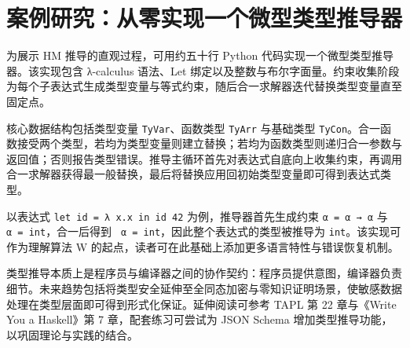 \chapter{案例研究：从零实现一个微型类型推导器}
为展示 HM 推导的直观过程，可用约五十行 Python 代码实现一个微型类型推导器。该实现包含 λ-calculus 语法、Let 绑定以及整数与布尔字面量。约束收集阶段为每个子表达式生成类型变量与等式约束，随后合一求解器迭代替换类型变量直至固定点。\par
核心数据结构包括类型变量 \texttt{TyVar}、函数类型 \texttt{TyArr} 与基础类型 \texttt{TyCon}。合一函数接受两个类型，若均为类型变量则建立替换；若均为函数类型则递归合一参数与返回值；否则报告类型错误。推导主循环首先对表达式自底向上收集约束，再调用合一求解器获得最一般替换，最后将替换应用回初始类型变量即可得到表达式类型。\par
以表达式 \texttt{let id = λ x.x in id 42} 为例，推导器首先生成约束 \texttt{α = α → α} 与 \texttt{ α = int}，合一后得到 \texttt{ α = int}，因此整个表达式的类型被推导为 \texttt{int}。该实现可作为理解算法 W 的起点，读者可在此基础上添加更多语言特性与错误恢复机制。\par
类型推导本质上是程序员与编译器之间的协作契约：程序员提供意图，编译器负责细节。未来趋势包括将类型安全延伸至全同态加密与零知识证明场景，使敏感数据处理在类型层面即可得到形式化保证。延伸阅读可参考 TAPL 第 22 章与《Write You a Haskell》第 7 章，配套练习可尝试为 JSON Schema 增加类型推导功能，以巩固理论与实践的结合。\par
